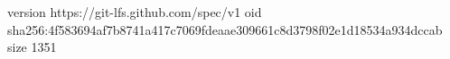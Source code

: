 version https://git-lfs.github.com/spec/v1
oid sha256:4f583694af7b8741a417c7069fdeaae309661c8d3798f02e1d18534a934dccab
size 1351
